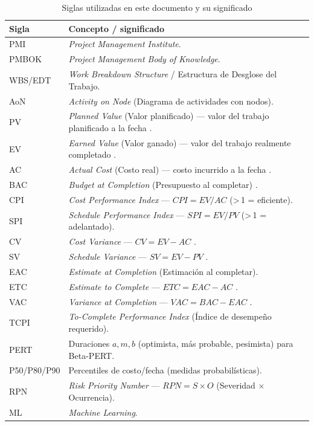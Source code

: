 \documentclass[12pt]
{charter}
\begin{document}
\begin{table}[h]
\centering
\caption{Siglas utilizadas en este documento y su significado}
\begin{tabularx}{\textwidth}{lY}
\toprule
\textbf{Sigla} & \textbf{Concepto / significado} \\
\midrule
PMI & \textit{Project Management Institute}. \\
PMBOK & \textit{Project Management Body of Knowledge}. \\
WBS/EDT & \textit{Work Breakdown Structure} / Estructura de Desglose del Trabajo. \\
AoN & \textit{Activity on Node} (Diagrama de actividades con nodos). \\
PV & \textit{Planned Value} (Valor planificado) — valor del trabajo planificado a la fecha \;[\$]. \\
EV & \textit{Earned Value} (Valor ganado) — valor del trabajo realmente completado \;[\$]. \\
AC & \textit{Actual Cost} (Costo real) — costo incurrido a la fecha \;[\$]. \\
BAC & \textit{Budget at Completion} (Presupuesto al completar) \;[\$]. \\
CPI & \textit{Cost Performance Index} — $CPI = EV/AC$ (>\,1 = eficiente). \\
SPI & \textit{Schedule Performance Index} — $SPI = EV/PV$ (>\,1 = adelantado). \\
CV & \textit{Cost Variance} — $CV = EV - AC$ \;[\$]. \\
SV & \textit{Schedule Variance} — $SV = EV - PV$ \;[\$]. \\
EAC & \textit{Estimate at Completion} (Estimación al completar). \\
ETC & \textit{Estimate to Complete} — $ETC = EAC - AC$ \;[\$]. \\
VAC & \textit{Variance at Completion} — $VAC = BAC - EAC$ \;[\$]. \\
TCPI & \textit{To-Complete Performance Index} (Índice de desempeño requerido). \\
PERT & Duraciones $a,m,b$ (optimista, más probable, pesimista) para Beta-PERT. \\
P50/P80/P90 & Percentiles de costo/fecha (medidas probabilísticas). \\
RPN & \textit{Risk Priority Number} — $RPN = S \times O$ (Severidad $\times$ Ocurrencia). \\
ML & \textit{Machine Learning}. \\
\bottomrule
\end{tabularx}
\end{table}
\end{document}
